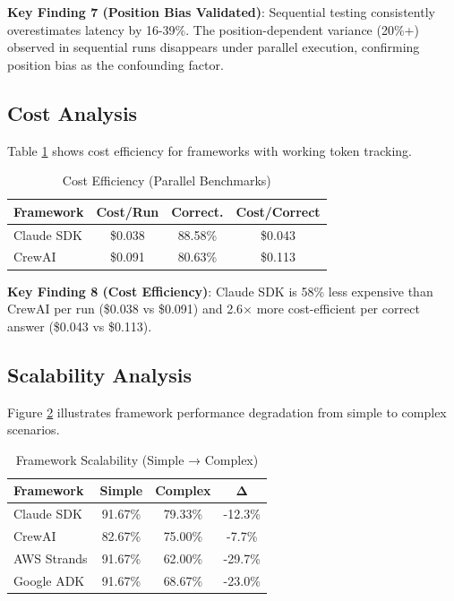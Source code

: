 \documentclass[sigconf,nonacm]{acmart}
\begin{document}
\textbf{Key Finding 7 (Position Bias Validated)}: Sequential testing consistently overestimates latency by 16-39\%. The position-dependent variance (20\%+) observed in sequential runs disappears under parallel execution, confirming position bias as the confounding factor.

\subsection{Cost Analysis}

Table \ref{tab:cost} shows cost efficiency for frameworks with working token tracking.

\begin{table}[h]
\caption{Cost Efficiency (Parallel Benchmarks)}
\label{tab:cost}
\begin{tabular}{lccc}
\toprule
\textbf{Framework} & \textbf{Cost/Run} & \textbf{Correct.} & \textbf{Cost/Correct} \\
\midrule
Claude SDK & \$0.038 & 88.58\% & \$0.043 \\
CrewAI & \$0.091 & 80.63\% & \$0.113 \\
\bottomrule
\end{tabular}
\end{table}

\textbf{Key Finding 8 (Cost Efficiency)}: Claude SDK is 58\% less expensive than CrewAI per run (\$0.038 vs \$0.091) and 2.6× more cost-efficient per correct answer (\$0.043 vs \$0.113).

\subsection{Scalability Analysis}

Figure \ref{fig:scalability} illustrates framework performance degradation from simple to complex scenarios.

\begin{table}[h]
\caption{Framework Scalability (Simple → Complex)}
\label{fig:scalability}
\begin{tabular}{lccc}
\toprule
\textbf{Framework} & \textbf{Simple} & \textbf{Complex} & \textbf{Δ} \\
\midrule
Claude SDK & 91.67\% & 79.33\% & -12.3\% \\
CrewAI & 82.67\% & 75.00\% & -7.7\% \\
AWS Strands & 91.67\% & 62.00\% & -29.7\% \\
Google ADK & 91.67\% & 68.67\% & -23.0\% \\
\bottomrule
\end{tabular}
\end{table}
\end{document}
